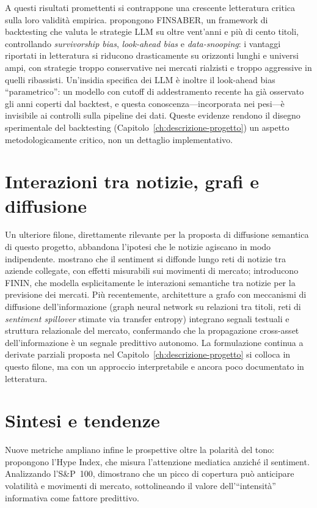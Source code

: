 A questi risultati promettenti si contrappone una crescente letteratura critica sulla loro validità empirica.
\textcite{li2025finsaber} propongono FINSABER, un framework di backtesting che valuta le strategie LLM su oltre vent'anni e più di cento titoli, controllando \textit{survivorship bias}, \textit{look-ahead bias} e \textit{data-snooping}: i vantaggi riportati in letteratura si riducono drasticamente su orizzonti lunghi e universi ampi, con strategie troppo conservative nei mercati rialzisti e troppo aggressive in quelli ribassisti.
Un'insidia specifica dei LLM è inoltre il look-ahead bias ``parametrico'': un modello con cutoff di addestramento recente ha già osservato gli anni coperti dal backtest, e questa conoscenza---incorporata nei pesi---è invisibile ai controlli sulla pipeline dei dati.
Queste evidenze rendono il disegno sperimentale del backtesting (Capitolo~\ref{ch:descrizione-progetto}) un aspetto metodologicamente critico, non un dettaglio implementativo.

\section{Interazioni tra notizie, grafi e diffusione}

Un ulteriore filone, direttamente rilevante per la proposta di diffusione semantica di questo progetto, abbandona l'ipotesi che le notizie agiscano in modo indipendente.
\textcite{wan2021sentimentdiffusion} mostrano che il sentiment si diffonde lungo reti di notizie tra aziende collegate, con effetti misurabili sui movimenti di mercato; \textcite{wang2024finin} introducono FININ, che modella esplicitamente le interazioni semantiche tra notizie per la previsione dei mercati.
Più recentemente, architetture a grafo con meccanismi di diffusione dell'informazione (graph neural network su relazioni tra titoli, reti di \textit{sentiment spillover} stimate via transfer entropy) integrano segnali testuali e struttura relazionale del mercato, confermando che la propagazione cross-asset dell'informazione è un segnale predittivo autonomo.
La formulazione continua a derivate parziali proposta nel Capitolo~\ref{ch:descrizione-progetto} si colloca in questo filone, ma con un approccio interpretabile e ancora poco documentato in letteratura.

\section{Sintesi e tendenze}

Nuove metriche ampliano infine le prospettive oltre la polarità del tono: \textcite{cao2025hypeindexnlpdrivenmeasure} propongono l'Hype Index, che misura l'attenzione mediatica anziché il sentiment.
Analizzando l'S\&P~100, dimostrano che un picco di copertura può anticipare volatilità e movimenti di mercato, sottolineando il valore dell'``intensità'' informativa come fattore predittivo.

